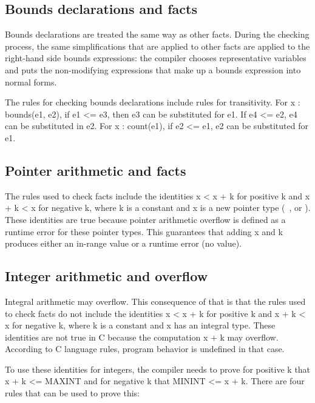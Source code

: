 \subsection{Bounds declarations and facts}\label{bounds-declarations-and-facts}

Bounds declarations are treated the same way as other facts. During the
checking process, the same simplifications that are applied to other
facts are applied to the right-hand side bounds expressions: the
compiler chooses representative variables and puts the non-modifying
expressions that make up a bounds expression into normal forms.

The rules for checking bounds declarations include rules for
transitivity. For x : bounds(e1, e2), if e1 \textless{}= e3, then e3 can
be substituted for e1. If e4 \textless{}= e2, e4 can be substituted in
e2. For x : count(e1), if e2 \textless{}= e1, e2 can be substituted for
e1.

\subsection{Pointer arithmetic and facts}\label{pointer-arithmetic-and-facts}

The rules used to check facts include the identities x \textless{} x + k
for positive k and x + k \textless{} x for negative k, where k is a
constant and x is a new pointer type (\ptr\,
\arrayview, or \arrayptr). These identities are true
because pointer arithmetic overflow is defined as a runtime error for
these pointer types. This guarantees that adding x and k produces either
an in-range value or a runtime error (no value).

\subsection{Integer arithmetic and overflow}\label{integer-arithmetic-and-overflow}

Integral arithmetic may overflow. This consequence of that is that the
rules used to check facts do not include the identities x \textless{} x
+ k for positive k and x + k \textless{} x for negative k, where k is a
constant and x has an integral type. These identities are not true in C
because the computation x + k may overflow. According to C language
rules, program behavior is undefined in that case.

To use these identities for integers, the compiler needs to prove for
positive k that x + k \textless{}= MAXINT and for negative k that MININT
\textless{}= x + k. There are four rules that can be used to prove this:

